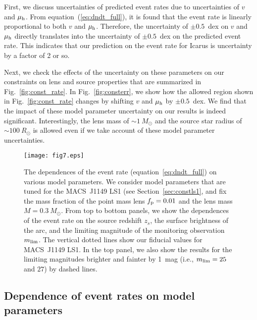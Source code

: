 \documentclass[showpacs,twocolumn,preprintnumbers,amsmath,amssymb,superscriptaddress,nofootinbib]{revtex4}
\newcommand{\morv}[1]{#1}
\begin{document}
\morv{First, we discuss uncertainties of predicted event rates due to
  uncertainties of $v$ and $\mu_{\rm h}$. From
  equation~(\ref{eq:dndt_full}), it is found that the event rate is
  linearly proportional to both $v$ and $\mu_{\rm h}$. Therefore, the
  uncertainty of $\pm 0.5$~dex on $v$ and $\mu_{\rm h}$ directly
  translates into the uncertainty of $\pm 0.5$~dex on the predicted
  event rate. This indicates that our prediction on the event rate for
   Icarus is uncertainty by a factor of 2 or so. }

\morv{Next, we check the effects of the uncertainty on these
  parameters on our constraints on lens and source properties that
  are summarized in Fig.~\ref{fig:const_rate}. In
  Fig.~\ref{fig:consterr}, we show how the allowed region shown in
  Fig.~\ref{fig:const_rate} changes by shifting $v$ and $\mu_{\rm h}$
  by $\pm 0.5$~dex. We find that the impact of these model parameter
  uncertainty on our results is indeed significant. Interestingly, the
  lens mass of $\sim 1~M_\odot$ and the source star radius of $\sim
  100~R_\odot$ is allowed even if we take account of these model
  parameter uncertainties.
}

\begin{figure}[t]
\begin{center}
\texttt{[image: fig7.eps]}
\end{center}
\caption{The dependences of the event rate
  (equation~\ref{eq:dndt_full}) on various model parameters. We
  consider model parameters that are tuned for the MACS~J1149 LS1 (see
  Section~\ref{sec:constls1}, and fix the mass fraction of the point
  mass lens $f_{\rm p}=0.01$ and the lens mass $M=0.3~M_\odot$. From
  top to bottom panels, we show the dependences of the event rate on
  the source redshift $z_s$, the surface brightness of the arc, and
  the limiting magnitude of the monitoring observation $m_{\rm lim}$.
  The vertical dotted lines show our fiducial values for MACS~J1149
  LS1. In the top panel, we also show the results for the limiting
  magnitudes brighter and fainter by 1~mag (i.e., $m_{\rm lim}=25$
  and $27$) by dashed lines. }
\label{fig:rate_par}
\end{figure}


\subsection{Dependence of event rates on model parameters}
\end{document}

